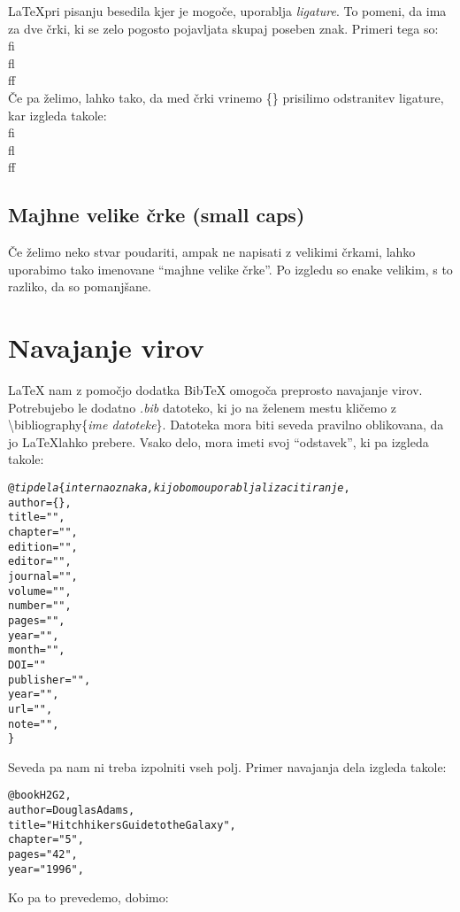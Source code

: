 \documentclass[a4paper]{book}
\newcommand\tbs{\textbackslash{}}
\begin{document}
\LaTeX pri pisanju besedila kjer je mogoče, uporablja \textit{ligature}. To pomeni, da ima za dve črki, ki se zelo pogosto pojavljata skupaj poseben znak. Primeri tega so:\\[15pt]
{\Huge fi}\\[15pt]
{\Huge fl}\\[15pt]
{\Huge ff}\\[15pt]
Če pa želimo, lahko tako, da med črki vrinemo \{\} prisilimo odstranitev ligature, kar izgleda takole:\\[15pt]
{\Huge f{}i}\\[15pt]
{\Huge f{}l}\\[15pt]
{\Huge f{}f}\\[15pt]

\subsection{Majhne velike črke (small caps)}

Če želimo neko stvar poudariti, ampak ne napisati z velikimi črkami, lahko uporabimo tako imenovane ``majhne velike črke''. Po izgledu so enake velikim, s to razliko, da so pomanjšane. 



\section{Navajanje virov}

\LaTeX{} nam z pomočjo dodatka Bib\TeX{} omogoča preprosto navajanje virov. Potrebujebo le dodatno \textit{.bib} datoteko, ki jo na želenem mestu kličemo z \tbs{}bibliography\{\textit{ime datoteke}\}. Datoteka mora biti seveda pravilno oblikovana, da jo \LaTeX lahko prebere.
Vsako delo, mora imeti svoj ``odstavek'', ki pa izgleda takole:

\begin{alltt}

@\textit{tip dela}\{\textit{interna oznaka, ki jo bomo uporabljali za citiranje},
  author = \{\},
  title = "",
  chapter = "",
  edition = "",
  editor = "",
  journal = "",
  volume = "",
  number = "",
  pages = "",
  year = "",
  month = "",
  DOI = ""
  publisher = "",
  year = "",
  url = "",
  note = "",
\}

\end{alltt}

Seveda pa nam ni treba izpolniti vseh polj. Primer navajanja dela izgleda takole:

\begin{alltt}

@book {H2G2,
  author = {Douglas Adams},
  title = "Hitchhikers Guide to the Galaxy",
  chapter = "5",
  pages = "42",
  year = "1996",
}

\end{alltt}

Ko pa to prevedemo, dobimo:

%
%


\end{document}
